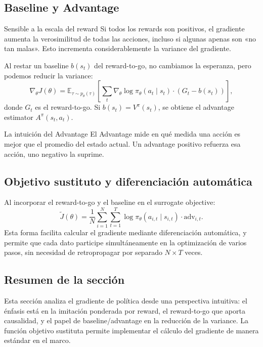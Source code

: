 \subsection{Baseline y Advantage}

\begin{warningbox}{Sensible a la escala del reward}
Si todos los rewards son positivos, el gradiente aumenta la verosimilitud de todas las acciones, incluso si algunas apenas son «no tan malas». Esto incrementa considerablemente la variance del gradiente.
\end{warningbox}

Al restar un baseline $b(s_t)$ del reward-to-go, no cambiamos la esperanza, pero podemos reducir la variance:
$$\nabla_\theta J(\theta) = \mathbb{E}_{\tau \sim p_\theta(\tau)} \left[\sum_t \nabla_\theta \log \pi_\theta(a_t \mid s_t) \cdot (G_t - b(s_t))\right],$$
donde $G_t$ es el reward-to-go. Si $b(s_t)=V^\pi(s_t)$, se obtiene el advantage estimator $A^\pi(s_t,a_t)$.

\begin{importantbox}{La intuición del Advantage}
El Advantage mide en qué medida una acción es mejor que el promedio del estado actual. Un advantage positivo refuerza esa acción, uno negativo la suprime.
\end{importantbox}

\subsection{Objetivo sustituto y diferenciación automática}

Al incorporar el reward-to-go y el baseline en el surrogate objective:
$$\tilde{J}(\theta) = \frac{1}{N}\sum_{i=1}^{N}\sum_{t=1}^{T} \log \pi_\theta(a_{i,t} \mid s_{i,t}) \cdot \text{adv}_{i,t}.$$
Esta forma facilita calcular el gradiente mediante diferenciación automática, y permite que cada dato participe simultáneamente en la optimización de varios pasos, sin necesidad de retropropagar por separado $N \times T$ veces.

\subsection{Resumen de la sección}

Esta sección analiza el gradiente de política desde una perspectiva intuitiva: el énfasis está en la imitación ponderada por reward, el reward-to-go que aporta causalidad, y el papel de baseline/advantage en la reducción de la variance. La función objetivo sustituta permite implementar el cálculo del gradiente de manera estándar en el marco.

